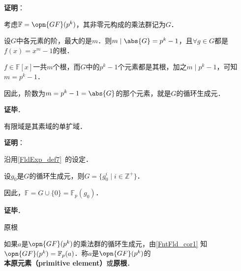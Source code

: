 \textbf{证明}：

考虑$\mathbb{F}=\opn{GF}(p^k)$，其非零元构成的乘法群记为$G$．

设$G$中各元素的阶，最大的是$m$．则$m\mid \abs{G} = p^k-1$，且$\forall g\in G$都是$f(x)=x^m-1$的根．

$f\in\mathbb{F}[x]$一共$m$个根，而$G$中的$p^k-1$个元素都是其根，加之$m\mid p^k-1$，可知$m=p^k-1$．

因此，阶数为$m=p^k-1=\abs{G}$的那个元素，就是$G$的循环生成元．

\textbf{证毕}．

\begin{corollary}{}\label{FntFld_cor1}
有限域是其素域的单扩域．
\end{corollary}

\textbf{证明}：

沿用\autoref{FldExp_def7}~的设定．

设$g_0$是$G$的循环生成元，则$G=\{g_0^i\mid i\in\mathbb{Z}^+\}$．

因此，$\mathbb{F}=G\cup\{0\}=\mathbb{F}_p(g_0)$．

\textbf{证毕}．

\begin{definition}{原根}

如果$a$是$\opn{GF}(p^k)$的乘法群的循环生成元，由\autoref{FntFld_cor1} 知$\opn{GF}(p^k)=\mathbb{F}_p(a)$．称$a$是$\opn{GF}(p^k)$的\textbf{本原元素（primitive element）}或\textbf{原根}．


\end{definition}

